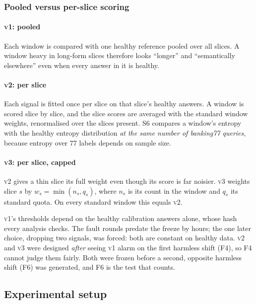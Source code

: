 \documentclass{article}
\newcommand{\vone}{\textsc{v1}}
\newcommand{\vtwo}{\textsc{v2}}
\newcommand{\vthree}{\textsc{v3}}
\begin{document}
\subsubsection{Pooled versus per-slice scoring}
\label{sec:scoring}
\paragraph{\vone: pooled} Each window is compared with one healthy reference
pooled over all slices. A window heavy in long-form slices therefore looks
``longer'' and ``semantically elsewhere'' even when every answer in it is healthy.

\paragraph{\vtwo: per slice} Each signal is fitted once per slice on that slice's
healthy answers. A window is scored slice by slice, and the slice scores are
averaged with the standard window weights, renormalised over the slices present.
S6 compares a window's entropy with the healthy entropy distribution \emph{at the
same number of banking77 queries}, because entropy over 77 labels depends on
sample size.

\paragraph{\vthree: per slice, capped} \vtwo{} gives a thin slice its full weight
even though its score is far noisier. \vthree{} weights slice $s$ by
$w_s=\min(n_s, q_s)$, where $n_s$ is its count in the window and $q_s$ its
standard quota. On every standard window this equals \vtwo.

\vone{}'s thresholds depend on the healthy calibration answers alone, whose hash
every analysis checks. The fault rounds predate the freeze by hours; the one later
choice, dropping two signals, was forced: both are constant on healthy data. \vtwo{} and \vthree{} were
designed \emph{after} seeing \vone{} alarm on the first harmless shift (F4), so
F4 cannot judge them fairly. Both were frozen before a second, opposite harmless
shift (F6) was generated, and F6 is the test that counts.

\subsection{Experimental setup}
\label{app:fixed-setup}
\end{document}
